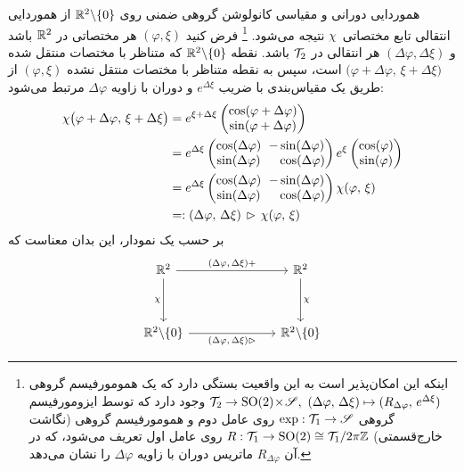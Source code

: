 هموردایی دورانی و مقیاسی کانولوشن گروهی ضمنی روی $\mathbb{R}^2 \backslash \{0\}$ از هموردایی انتقالی تابع مختصاتی~$\chi$ نتیجه می‌شود.%
\footnote{
	اینکه این امکان‌پذیر است به این واقعیت بستگی دارد که یک همومورفیسم گروهی
	$\mathcal{T}_2 \to \operatorname{SO}(2) \!\times\! \mathscr{S},\ (\Delta\varphi,\, \Delta\xi) \mapsto (R_{\Delta\varphi},\, e^{\Delta\xi})$
	وجود دارد که توسط ایزومورفیسم گروهی $\exp: \mathcal{T}_1 \to \mathscr{S}$ روی عامل دوم و همومورفیسم گروهی (نگاشت خارج‌قسمتی) $R: \mathcal{T}_1 \to \operatorname{SO}(2) \cong \mathcal{T}_1 / 2\pi\mathbb{Z}$ روی عامل اول تعریف می‌شود، که در آن $R_{\Delta\varphi}$
	ماتریس دوران با زاویه $\Delta\varphi$ را نشان می‌دهد.
}
فرض کنید $(\varphi, \xi)$ هر مختصاتی در $\mathbb{R}^2$ باشد و $(\Delta\varphi, \Delta\xi)$ هر انتقالی در $\mathcal{T}_2$ باشد.
نقطه $\mathbb{R}^2 \backslash \{0\}$ که متناظر با مختصات منتقل شده ${(\varphi \!+\! \Delta\varphi} ,\, {\xi \!+\! \Delta\xi)}$ است، سپس به نقطه متناظر با مختصات منتقل نشده $(\varphi, \xi)$ از طریق یک مقیاس‌بندی با ضریب $e^{\Delta\xi}$ و دوران با زاویه $\Delta\varphi$ مرتبط می‌شود:
\begin{align}\label{eq:log_polar_translation_equivariance}
	\chi \big( \varphi+\Delta\varphi ,\, \xi+\Delta\xi \big)
	&= e^{\xi+\Delta\xi} \begin{pmatrix} \cos(\varphi+\Delta\varphi) \\ \sin(\varphi+\Delta\varphi) \end{pmatrix} \notag \\
	&= e^{\Delta\xi}
	\begin{pmatrix} \cos(\Delta\varphi)\mkern-8mu & -\sin(\Delta\varphi) \\ \sin(\Delta\varphi)\mkern-8mu & \phantom{-} \cos(\Delta\varphi) \end{pmatrix}
	e^\xi \begin{pmatrix} \cos(\varphi) \\ \sin(\varphi) \end{pmatrix} \notag \\
	&= e^{\Delta\xi}
	\begin{pmatrix} \cos(\Delta\varphi)\mkern-8mu & -\sin(\Delta\varphi) \\ \sin(\Delta\varphi)\mkern-8mu & \phantom{-} \cos(\Delta\varphi) \end{pmatrix}
	\chi(\varphi,\, \xi) \notag \\
	&=: (\Delta\varphi,\, \Delta\xi) \,\rhd\, \chi(\varphi,\, \xi)
\end{align}
بر حسب یک نمودار، این بدان معناست که
\begin{equation}
	\begin{tikzcd}[row sep=3.5em, column sep=7.em]
		\R^2
		\arrow[r, "{(\Delta\varphi {,}\, \Delta\xi) +}"]
		\arrow[d, "\chi"']
		& \R^2
		\arrow[d, "\chi"]
		\\
		\R^2 \backslash \{0\}
		\arrow[r, "{(\Delta\varphi {,}\, \Delta\xi) \rhd}"']
		& \R^2 \backslash \{0\}
	\end{tikzcd}
\end{equation}
